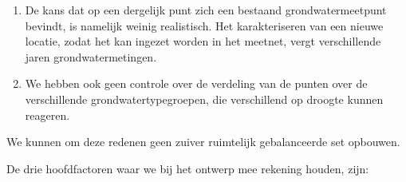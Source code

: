 \documentclass[11pt,]{book}
\providecommand{\tightlist}{%
  \setlength{\itemsep}{0pt}\setlength{\parskip}{0pt}}
\begin{document}
\begin{enumerate}
\def\labelenumi{\arabic{enumi}.}
\tightlist
\item
  De kans dat op een dergelijk punt zich een bestaand grondwatermeetpunt
  bevindt, is namelijk weinig realistisch. Het karakteriseren van een
  nieuwe locatie, zodat het kan ingezet worden in het meetnet, vergt
  verschillende jaren grondwatermetingen.
\item
  We hebben ook geen controle over de verdeling van de punten over de
  verschillende grondwatertypegroepen, die verschillend op droogte
  kunnen reageren.
\end{enumerate}

We kunnen om deze redenen geen zuiver ruimtelijk gebalanceerde set
opbouwen.

De drie hoofdfactoren waar we bij het ontwerp mee rekening houden, zijn:
\end{document}
